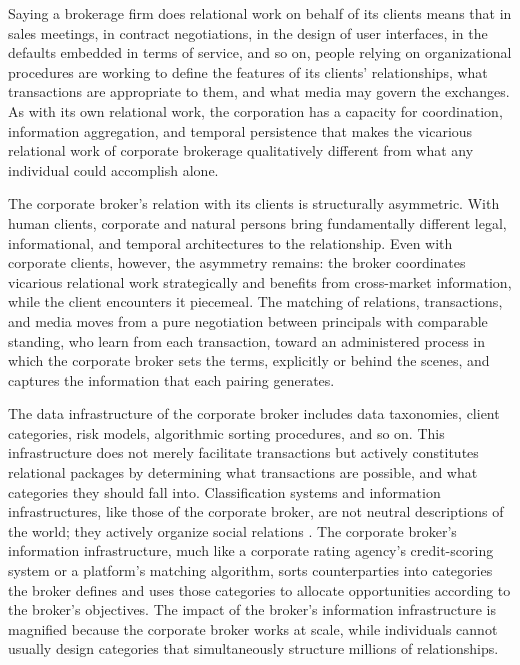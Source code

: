 \documentclass[
]{article}
\begin{document}
Saying a brokerage firm does relational work on behalf of its clients means that in sales meetings, in contract negotiations, in the design of user interfaces, in the defaults embedded in terms of service, and so on, people relying on organizational procedures are working to define the features of its clients' relationships, what transactions are appropriate to them, and what media may govern the exchanges. As with its own relational work, the corporation has a capacity for coordination, information aggregation, and temporal persistence that makes the vicarious relational work of corporate brokerage qualitatively different from what any individual could accomplish alone.

The corporate broker's relation with its clients is structurally asymmetric. With human clients, corporate and natural persons bring fundamentally different legal, informational, and temporal architectures to the relationship. Even with corporate clients, however, the asymmetry remains: the broker coordinates vicarious relational work strategically and benefits from cross-market information, while the client encounters it piecemeal. The matching of relations, transactions, and media moves from a pure negotiation between principals with comparable standing, who learn from each transaction, toward an administered process in which the corporate broker sets the terms, explicitly or behind the scenes, and captures the information that each pairing generates.

The data infrastructure of the corporate broker includes data taxonomies, client categories, risk models, algorithmic sorting procedures, and so on. This infrastructure does not merely facilitate transactions but actively constitutes relational packages by determining what transactions are possible, and what categories they should fall into. Classification systems and information infrastructures, like those of the corporate broker, are not neutral descriptions of the world; they actively organize social relations \autocite{fourcadeOrdinalSociety2024,geoffreyc.bowkerSortingThingsOut1999}. The corporate broker's information infrastructure, much like a corporate rating agency's credit-scoring system or a platform's matching algorithm, sorts counterparties into categories the broker defines and uses those categories to allocate opportunities according to the broker's objectives. The impact of the broker's information infrastructure is magnified because the corporate broker works at scale, while individuals cannot usually design categories that simultaneously structure millions of relationships.
\end{document}
